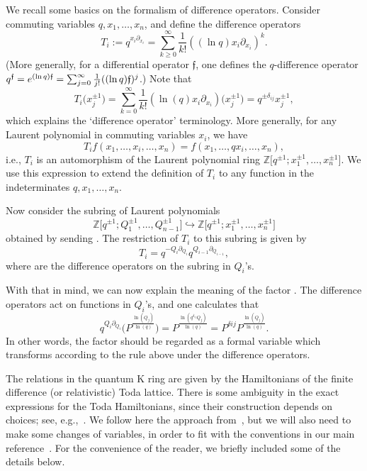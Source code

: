 \documentclass[11pt]{article}
\numberwithin{equation}{section}
\numberwithin{equation}{section}
\theoremstyle{definition}
\newcommand{\Z}{{\mathbb Z}}
\begin{document}
We recall some basics on the formalism of difference operators. Consider commuting
variables $q, x_1, \dots, x_n$, and define the difference operators
\[
T_i:= q^{x_i \partial_{x_i}} = \sum_{ k \ge 0}^\infty \frac{1}{k!}((\ln q)x_i \partial_{x_i} )^k.
\]
\big(More generally, for a differential operator $\mathfrak{f}$, one defines the $q$-difference operator $q^{\mathfrak{f}}={\rm e}^{(\ln q) \mathfrak{f}}=\sum_{j=0}^\infty \frac{1}{j!}((\ln q)\mathfrak{f})^j$.\big) Note that
\[
T_i \bigl(x_j^{\pm 1}\bigr) = \sum_{k=0}^\infty \frac{1}{k!} ( \ln(q) x_i \partial_{x_i} ) \bigl(x_j^{\pm 1}\bigr) = q^{\pm \delta_{ij}} x_j^{\pm 1} ,
\]
which explains the `difference operator' terminology. More generally, for any Laurent polynomial in commuting variables $x_i$, we have
\[
T_i f(x_1,\dots,x_i,\dots,x_n) = f(x_1,\dots,qx_i,\dots, x_n) ,
\]
i.e., $T_i$ is an automorphism of the Laurent polynomial ring
$\Z\bigl[q^{\pm 1}; x_1^{\pm 1}, \dots, x_{n}^{\pm 1}\bigr]$.
We use this expression to extend the definition of $T_i$ to any function in the indeterminates $q, x_1, \dots, x_n$.

Now consider the subring of Laurent polynomials
\[
\Z\bigl[q^{\pm 1}; Q_1^{\pm 1}, \dots, Q_{n-1}^{\pm 1}\bigr] \hookrightarrow \Z\bigl[q^{\pm 1}; x_1^{\pm 1}, \dots, x_{n}^{\pm 1}\bigr]
\]
obtained by sending . The restriction of $T_i$ to this subring is given by
\begin{equation}\label{E: TiQ}
T_i = q^{-Q_{i}\partial_{Q_{i}}}q^{Q_{i-1}\partial_{Q_{i-1}}} ,
\end{equation}
where  are the difference operators on the subring in $Q_i$'s.

With that in mind, we can now explain the meaning of the factor .
The difference operators  act on functions in $Q_i$'s, and
one calculates that
\[ q^{Q_i \partial_{Q_i}}\bigl(P^{\frac{\ln(Q_j)}{\ln(q)}}\bigr) =
P^{\frac{\ln(q^{\delta_{ij}} Q_j)}{\ln(q)}} = P^{\delta{ij}}
P^{\frac{\ln(Q_j)}{\ln(q)}} . \]
In other words, the factor  should be regarded as
a formal variable
which transforms according to the rule above under the difference operators.

The relations in the quantum K ring are given by the Hamiltonians of the finite difference
(or relativistic) Toda lattice. There is some ambiguity in the exact expressions for the
Toda Hamiltonians, since their construction depends on choices;
see, e.g.,~\cite[Remark~5]{givental_lee}. We follow here the approach from~\cite{gloI},
but we will also need to make some changes of variables,
in order to fit with the conventions in our main reference~\cite{givental_lee}.
For the convenience of the reader, we briefly included some of the details below.
\end{document}
